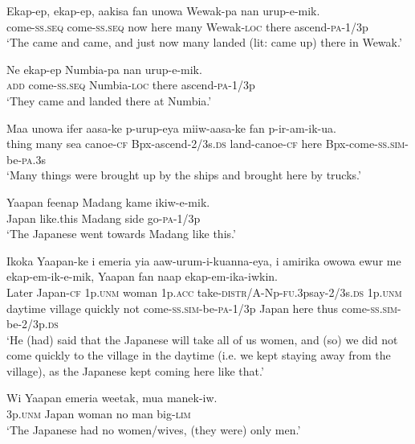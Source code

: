 {\ea\label{ex:a:x27}
\gll  Ekap-ep,  ekap-ep,  aakisa  fan  unowa  Wewak-pa  nan  urup-e-mik. \\
come-\textsc{ss.seq}  come-\textsc{ss.seq}  now  here  many  Wewak-\textsc{loc} there  ascend-\textsc{pa}-1/3p \\
\glt ‘The came and came, and just now many landed (lit: came up) there in Wewak.’ \\
\z


\ea\label{ex:a:x28}
\gll  Ne  ekap-ep  Numbia-pa  nan  urup-e-mik. \\
\textsc{add}  come{}-\textsc{ss.seq}  Numbia-\textsc{loc}  there  ascend-\textsc{pa}-1/3p \\
\glt ‘They came and landed there at Numbia.’ \\
\z


\ea\label{ex:a:x29}
\gll  Maa  unowa  ifer  aasa-ke  p-urup-eya  miiw-aasa-ke fan  p-ir-am-ik-ua.\\
thing  many  sea  canoe-\textsc{cf}  Bpx-ascend-2/3s.\textsc{ds}  land-canoe-\textsc{cf} here  Bpx-come-\textsc{ss}.\textsc{sim}-be-\textsc{pa}.3s\\ 
\glt ‘Many things were brought up by the ships and brought here by trucks.’ \\
\z


\ea\label{ex:a:x30}
\gll  Yaapan  feenap  Madang  kame  ikiw-e-mik. \\
Japan  like.this  Madang  side  go-\textsc{pa}-1/3p \\
\glt ‘The Japanese went towards Madang like this.’ \\
\z


\ea\label{ex:a:x31}
\gll  Ikoka  Yaapan-ke  i  emeria  yia  aaw-urum-i-kuanna-eya,  i  amirika  owowa  ewur  me ekap-em-ik-e-mik,  Yaapan  fan  naap  ekap-em-ika-iwkin. \\
Later  Japan-\textsc{cf}  1p.\textsc{unm}  woman  1p.\textsc{acc}  take-\textsc{distr}/A-Np-\textsc{fu}.3psay-2/3s.\textsc{ds}  1p.\textsc{unm}  daytime  village  quickly  not come-\textsc{ss}.\textsc{sim}-be-\textsc{pa}-1/3p  Japan  here  thus  come-\textsc{ss}.\textsc{sim}-be-2/3p.\textsc{ds} \\
\glt ‘He (had) said that the Japanese will take all of us women, and (so) we did not come quickly to the village in the daytime (i.e. we kept staying away from the village), as the Japanese kept coming here like that.’ \\
\z


\ea\label{ex:a:x32}
\gll  Wi  Yaapan  emeria  weetak,  mua  manek-iw. \\
3p.\textsc{unm}  Japan  woman  no  man  big-\textsc{lim} \\
\glt ‘The Japanese had no women/wives, (they were) only men.’ \\
\z


}
